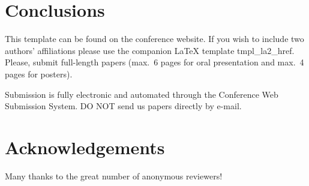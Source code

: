 \documentclass[twoside]{article}
\begin{document}
\section{Conclusions}
This template can be found on the conference website. 
If you wish to include two authors' affiliations please use the companion LaTeX template tmpl\_la2\_href. 
Please, submit full-length papers (max.~6 pages for oral presentation and max.~4 pages for posters).
 
Submission is fully electronic and automated through the Conference Web Submission System. 
DO NOT send us papers directly by e-mail. 

\section{Acknowledgements}
Many thanks to the great number of anonymous reviewers!
\end{document}
